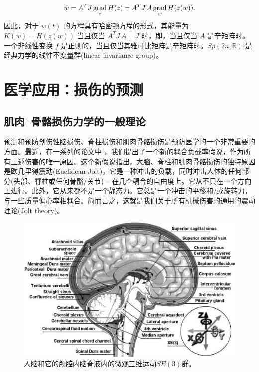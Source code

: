\documentclass[11pt,fontset=founder]{ctexart}
\begin{document}
\begin{equation*}
\dot{w}=A^{T}J\limfunc{grad}_{z}H(z)=A^{T}J\mathbf{\,}A\limfunc{grad}%
_{w}H(z(w)).
\end{equation*}%
因此，对于 $w(t)$ 的方程具有哈密顿方程的形式，其能量为 $K(w)=H(z(w))$ 当且仅当 $A^{T}J\mathbf{\,}A=J$ 时，即，当且仅当 $A$ 是辛矩阵时。一个非线性变换 $f$ 是正则的，当且仅当其雅可比矩阵是辛矩阵时。$Sp(2n,\mathbb{R})$ 是经典力学的线性不变量群(linear invariance group)。

\section{医学应用：损伤的预测}

\subsection{肌肉–骨骼损伤力学的一般理论}

预测和预防创伤性脑损伤、脊柱损伤和肌肉骨骼损伤是预防医学的一个非常重要的方面。最近，在一系列的论文中 \cite{ivbrain,ivspine,ivgen}，我们提出了一个新的耦合负载率假说，作为所有上述伤害的唯一原因。这个新假说指出，大脑、脊柱和肌肉骨骼损伤的独特原因是欧几里得震动(Euclidean Jolt)，它是一种冲击的负载，同时冲击人体的任何部分(头部、脊柱或任何骨骼/关节) -- 在几个耦合的自由度上。它从不只在一个方向上进行。此外，它从来都不是一个静态力。它总是一个冲击的平移和/或旋转力，与一些质量偏心率相耦合。简而言之，这就是我们关于所有机械伤害的通用的震动理论(Jolt theory)。%
\begin{figure}[h]
\centerline{\includegraphics[width=13cm]{BrainInj}}
\caption{人脑和它的颅腔内脑脊液内的微观三维运动$SE(3)$群。}
\label{BrainInj}
\end{figure}
\end{document}
